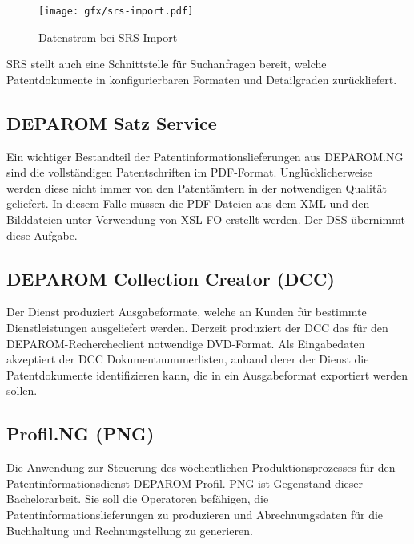 \begin{figure}[h]
  \texttt{[image: gfx/srs-import.pdf]}
  \caption{Datenstrom bei SRS-Import}
  \label{fig:SRSImport}
\end{figure}

SRS stellt auch eine Schnittstelle für Suchanfragen bereit, welche Patentdokumente
in konfigurierbaren Formaten und Detailgraden zurückliefert.

\subsection{DEPAROM Satz Service}
\label{ch:fachlichesUmfeld:Teilsysteme:DSS}

Ein wichtiger Bestandteil der Patentinformationslieferungen aus DEPAROM.NG sind
die vollständigen Patentschriften im PDF-Format. Unglücklicherweise werden diese
nicht immer von den Patentämtern in der notwendigen Qualität geliefert. In
diesem Falle müssen die PDF-Dateien aus dem XML und den Bilddateien unter
Verwendung von XSL-FO erstellt werden. Der DSS übernimmt diese Aufgabe.

\subsection{DEPAROM Collection Creator (DCC)}
\label{ch:fachlichesUmfeld:Teilsysteme:DCC}

Der Dienst produziert Ausgabeformate, welche an Kunden für bestimmte
Dienstleistungen ausgeliefert werden. Derzeit produziert der DCC das für den
DEPAROM-Rechercheclient notwendige DVD-Format. Als Eingabedaten akzeptiert der
DCC Dokumentnummerlisten, anhand derer der Dienst die Patentdokumente
identifizieren kann, die in ein Ausgabeformat exportiert werden sollen.

\subsection{Profil.NG (PNG)}
\label{ch:fachlichesUmfeld:Teilsysteme:PNG}

Die Anwendung zur Steuerung des wöchentlichen Produktionsprozesses für den
Patentinformationsdienst DEPAROM Profil. PNG ist Gegenstand dieser
Bachelorarbeit. Sie soll die Operatoren befähigen, die
Patentinformationslieferungen zu produzieren und Abrechnungsdaten für die
Buchhaltung und Rechnungstellung zu generieren.
